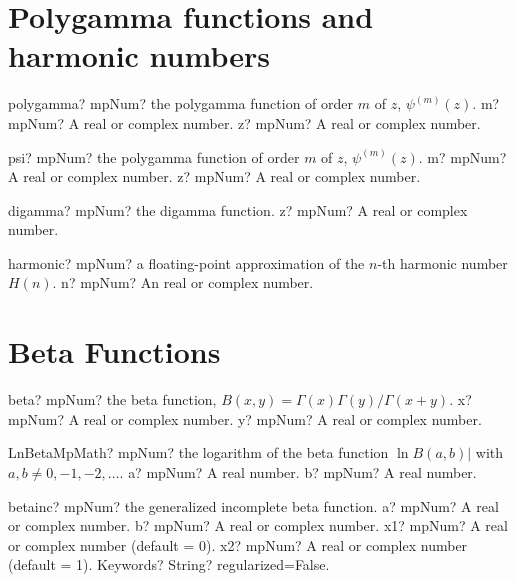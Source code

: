\documentclass[12pt,a4paper,openany]{book}
\begin{document}
\section{Polygamma functions and harmonic numbers}

\begin{mpFunctionsExtract}
\mpFunctionTwo
{polygamma? mpNum? the polygamma function of order $m$ of $z$, $\psi^{(m)}(z)$.}
{m? mpNum? A real or complex number.}
{z? mpNum? A real or complex number.}
\end{mpFunctionsExtract}

\begin{mpFunctionsExtract}
\mpFunctionTwo
{psi? mpNum? the polygamma function of order $m$ of $z$, $\psi^{(m)}(z)$.}
{m? mpNum? A real or complex number.}
{z? mpNum? A real or complex number.}
\end{mpFunctionsExtract}

\begin{mpFunctionsExtract}
\mpFunctionOne
{digamma? mpNum? the digamma function.}
{z? mpNum? A real or complex number.}
\end{mpFunctionsExtract}

\begin{mpFunctionsExtract}
\mpFunctionOne
{harmonic? mpNum? a floating-point approximation of the $n$-th harmonic number $H(n)$.}
{n? mpNum? An  real or complex number.}
\end{mpFunctionsExtract}

\section{Beta Functions}

\begin{mpFunctionsExtract}
\mpFunctionTwo
{beta? mpNum? the beta function, $B(x,y)=\Gamma(x) \Gamma(y)/\Gamma(x+y)$.}
{x? mpNum? A real or complex number.}
{y? mpNum? A real or complex number.}
\end{mpFunctionsExtract}

\begin{mpFunctionsExtract}
\mpFunctionTwoNotImplemented
{LnBetaMpMath? mpNum? the logarithm of the beta function $\ln B(a,b)|$ with $a,b \neq 0,-1,-2,\ldots$.}
{a? mpNum? A real number.}
{b? mpNum? A real number.}
\end{mpFunctionsExtract}

\begin{mpFunctionsExtract}
\mpFunctionFive
{betainc? mpNum? the generalized incomplete beta function.}
{a? mpNum? A real or complex number.}
{b? mpNum? A real or complex number.}
{x1? mpNum? A real or complex number (default = 0).}
{x2? mpNum? A real or complex number (default = 1).}
{Keywords? String?  regularized=False.}
\end{mpFunctionsExtract}
\end{document}
